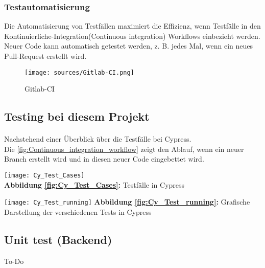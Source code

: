 \subsubsection*{Testautomatisierung}
Die Automatisierung von Testfällen maximiert die Effizienz, wenn Testfälle in den Kontinuierliche-Integration(Continuous integration) Workflows einbezieht werden. Neuer Code kann automatisch getestet werden, z. B. jedes Mal, wenn ein neues Pull-Request erstellt wird.

\begin{figure}[ht]
	\centering
    \texttt{[image: sources/Gitlab-CI.png]}\cite{MG10}
	\caption{Gitlab-CI}
	\label{fig:Continuous_integration_workflow } {\cite{GLAB1}}
\end{figure}


\subsection*{Testing bei diesem Projekt}
\paragraph{}
Nachstehend einer Überblick über die Testfälle bei Cypress.
\\
Die \autoref{fig:Continuous_integration_workflow} zeigt den Ablauf, wenn ein neuer Branch erstellt wird und in diesen neuer Code eingebettet wird.
\begin{center}
\texttt{[image: Cy\_Test\_Cases]}
\label{fig:Cy_Test_Cases}\\
\textbf{Abbildung \autoref{fig:Cy_Test_Cases}:} Testfälle in Cypress
\end{center}

\begin{center}
\texttt{[image: Cy\_Test\_running]}\label{fig:Cy_Test_running}
\textbf{Abbildung \autoref{fig:Cy_Test_running}:} Grafische Darstellung der verschiedenen Tests in Cypress
\end{center}



\subsection{Unit test (Backend)}
To-Do

